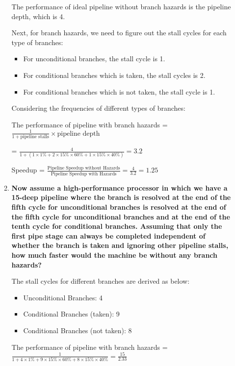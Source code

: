 \begin{enumerate}
\begin{enumerate}
        The performance of ideal pipeline without branch hazards is the pipeline depth, which is 4.
        
        Next, for branch hazards, we need to figure out the stall cycles for each type of branches:
        \begin{itemize}
            \item For unconditional branches, the stall cycle is 1.
            \item For conditional branches which is taken, the stall cycles is 2.
            \item For conditional branches which is not taken, the stall cycle is 1.
        \end{itemize}
        
        Considering the frequencies of different types of branches:
        
        The performance of pipeline with branch hazards = $\frac{1}{1+\text{pipeline stalls}} \times \text{pipeline depth}$
        
        = $\frac{4}{1+(1 \times 1\% + 2 \times 15\% \times 60\% + 1 \times 15\% \times 40\%)} = 3.2$
        
        Speedup = $\frac{\text{Pipeline Speedup without Hazards}}{\text{Pipeline Speedup with Hazards}} = \frac{4}{3.2} = 1.25$
        
        \item \textbf{Now assume a high-performance processor in which we have a 15-deep pipeline where the branch is resolved at the end of the fifth cycle for unconditional branches is resolved at the end of the fifth cycle for unconditional branches and at the end of the tenth cycle for conditional branches. Assuming that only the first pipe stage can always be completed independent of whether the branch is taken and ignoring other pipeline stalls, how much faster would the machine be without any branch hazards?}
        
        The stall cycles for different branches are derived as below:
        \begin{itemize}
            \item Unconditional Branches: 4
            \item Conditional Branches (taken): 9
            \item Conditional Branches (not taken): 8
        \end{itemize}
        
        The performance of pipeline with branch hazards = $\frac{1}{1 + 4 \times 1\% + 9 \times 15\% \times 60\% + 8 \times 15\% \times 40\%} = \frac{15}{2.33}$
        

\end{enumerate}
\end{enumerate}
